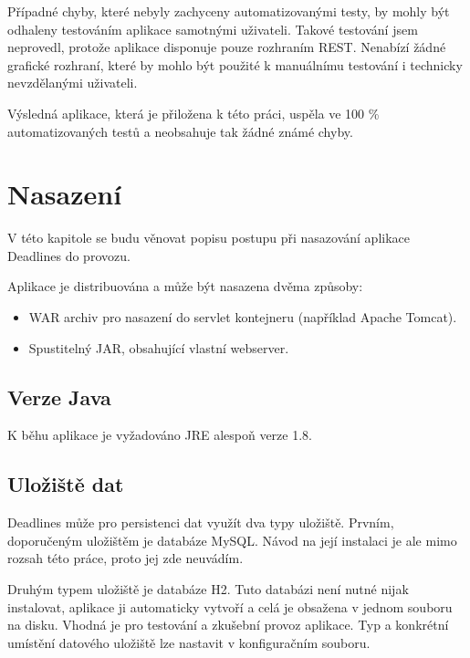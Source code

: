 \documentclass[thesis=B,czech]{FITthesis}[2012/06/26]
\begin{document}
		Případné chyby, které nebyly zachyceny automatizovanými testy, by mohly být odhaleny testováním aplikace samotnými uživateli. Takové testování jsem neprovedl, protože aplikace disponuje pouze rozhraním REST. Nenabízí žádné grafické rozhraní, které by mohlo být použité k manuálnímu testování i technicky nevzdělanými uživateli.
		
		
		Výsledná aplikace, která je přiložena k této práci, uspěla ve 100 \% automatizovaných testů a neobsahuje tak žádné známé chyby.


\chapter{Nasazení}
	\label{chapter:deployment}
	
	V této kapitole se budu věnovat popisu postupu při nasazování aplikace Deadlines do provozu.
	
	Aplikace je distribuována a může být nasazena dvěma způsoby:
	\begin{itemize}
		\item WAR archiv pro nasazení do servlet kontejneru (například Apache Tomcat).
		\item Spustitelný JAR, obsahující vlastní webserver.
	\end{itemize}
	
	\section{Verze Java}
		K běhu aplikace je vyžadováno JRE alespoň verze 1.8.
	
	\section{Uložiště dat}
		Deadlines může pro persistenci dat využít dva typy uložiště. Prvním, doporučeným uložištěm je databáze MySQL. Návod na její instalaci je ale mimo rozsah této práce, proto jej zde neuvádím.
	
		Druhým typem uložiště je databáze H2. Tuto databázi není nutné nijak instalovat, aplikace ji automaticky vytvoří a celá je obsažena v jednom souboru na disku. Vhodná je pro testování a zkušební provoz aplikace. Typ a konkrétní umístění datového uložiště lze nastavit v konfiguračním souboru.
	
\end{document}
